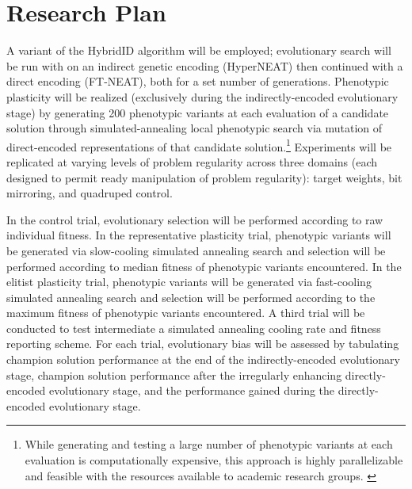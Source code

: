 \renewcommand{\thefootnote}{\fnsymbol{footnote}}
\section{Research Plan}
A variant of the HybridID \autocite{Clune2011OnRegularity} algorithm will be employed; evolutionary search will be run with on an indirect genetic encoding (HyperNEAT) then continued with a direct encoding (FT-NEAT), both for a set number of generations. Phenotypic plasticity will be realized (exclusively during the indirectly-encoded evolutionary stage) by generating 200 phenotypic variants at each evaluation of a candidate solution through simulated-annealing local phenotypic search via mutation of direct-encoded representations of that candidate solution.\footnote[1]{While generating and testing a large number of phenotypic variants at each evaluation is computationally expensive, this approach is highly parallelizable and feasible with the resources available to academic research groups. \autocite{Mengistu2016EvolvabilityIt}} Experiments will be replicated at varying levels of problem regularity across three domains (each designed to permit ready manipulation of problem regularity): target weights, bit mirroring, and quadruped control\autocite{Clune2011OnRegularity}. 

In the control trial, evolutionary selection will be performed according to raw individual fitness. In the representative plasticity trial, phenotypic variants will be generated via slow-cooling simulated annealing search and selection will be performed according to median fitness of phenotypic variants encountered. In the elitist plasticity trial, phenotypic variants will be generated via fast-cooling simulated annealing search and selection will be performed according to the maximum fitness of phenotypic variants encountered. A third trial will be conducted to test intermediate a simulated annealing cooling rate and fitness reporting scheme. For each trial, evolutionary bias will be assessed by tabulating champion solution performance at the end of the indirectly-encoded evolutionary stage, champion solution performance after the irregularly enhancing directly-encoded evolutionary stage, and the performance gained during the directly-encoded evolutionary stage.